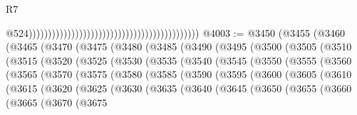 \begin{lexlean}{R7}
\begin{coremodule}
                                                                                            @524))))))))))))))))))))))))))))))))))))))))))))
@4003 := @3450
    (@3455
      (@3460
        (@3465
          (@3470
            (@3475
              (@3480
                (@3485
                  (@3490
                    (@3495
                      (@3500
                        (@3505
                          (@3510
                            (@3515
                              (@3520
                                (@3525
                                  (@3530
                                    (@3535
                                      (@3540
                                        (@3545
                                          (@3550
                                            (@3555
                                              (@3560
                                                (@3565
                                                  (@3570
                                                    (@3575
                                                      (@3580
                                                        (@3585
                                                          (@3590
                                                            (@3595
                                                              (@3600
                                                                (@3605
                                                                  (@3610
                                                                    (@3615
                                                                      (@3620
                                                                        (@3625
                                                                          (@3630
                                                                            (@3635
                                                                              (@3640
                                                                                (@3645
                                                                                  (@3650
                                                                                    (@3655
                                                                                      (@3660
                                                                                        (@3665
                                                                                          (@3670
                                                                                            (@3675

\end{coremodule}
\end{lexlean}
